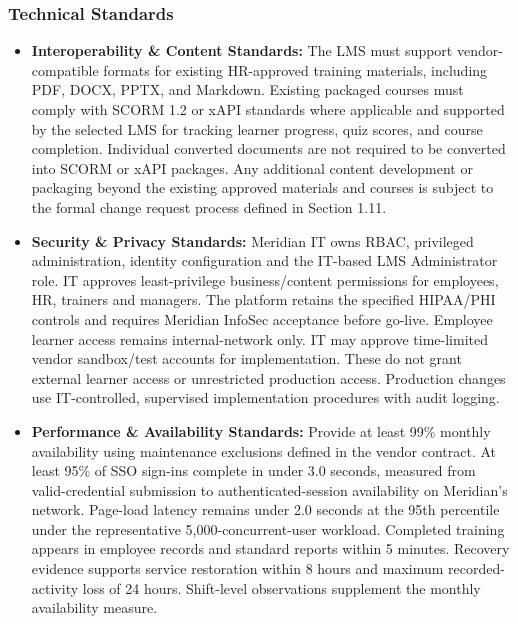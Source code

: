 \subsubsection{Technical Standards}\label{sec:technical-standards}
\begin{itemize}
\item \textbf{Interoperability \& Content Standards:} The LMS must support vendor-compatible formats for existing HR-approved training materials, including PDF, DOCX, PPTX, and Markdown. Existing packaged courses must comply with SCORM 1.2 or xAPI standards where applicable and supported by the selected LMS for tracking learner progress, quiz scores, and course completion. Individual converted documents are not required to be converted into SCORM or xAPI packages. Any additional content development or packaging beyond the existing approved materials and courses is subject to the formal change request process defined in Section 1.11.
\item \textbf{Security \& Privacy Standards:} Meridian IT owns RBAC, privileged administration, identity configuration and the IT-based LMS Administrator role. IT approves least-privilege business/\allowbreak{}content permissions for employees, HR, trainers and managers. The platform retains the specified HIPAA/\allowbreak{}PHI controls and requires Meridian InfoSec acceptance before go-live. Employee learner access remains internal-network only. IT may approve time-limited vendor sandbox/\allowbreak{}test accounts for implementation. These do not grant external learner access or unrestricted production access. Production changes use IT-controlled, supervised implementation procedures with audit logging.
\item \textbf{Performance \& Availability Standards:} Provide at least 99\% monthly availability using maintenance exclusions defined in the vendor contract. At least 95\% of SSO sign-ins complete in under 3.0 seconds, measured from valid-credential submission to authenticated-session availability on Meridian's network. Page-load latency remains under 2.0 seconds at the 95th percentile under the representative 5,000-concurrent-user workload. Completed training appears in employee records and standard reports within 5 minutes. Recovery evidence supports service restoration within 8 hours and maximum recorded-activity loss of 24 hours. Shift-level observations supplement the monthly availability measure.
\end{itemize}


